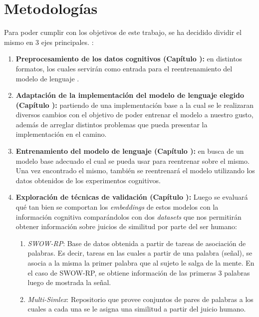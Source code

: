 \chapter{Metodologías}

Para poder cumplir con los objetivos de este trabajo, se ha decidido dividir el mismo en 3 ejes principales. :

\begin{enumerate}
    \item \textbf{Preprocesamiento de los datos cognitivos (Capítulo \bb{[Ref]}):} en distintos formatos, los cuales servirán como entrada para el reentrenamiento del modelo de lenguaje .
    \item \textbf{Adaptación de la implementación del modelo de lenguaje elegido (Capítulo \bb{[Ref]}):} partiendo de una implementación base a la cual se le realizaran diversos cambios con el objetivo de poder entrenar el modelo a nuestro gusto, además de arreglar distintos problemas que pueda presentar la implementación en el camino.
    \item \textbf{Entrenamiento del modelo de lenguaje (Capítulo \bb{[Ref]}):} en busca de un modelo base adecuado el cual se pueda usar para reentrenar sobre el mismo. Una vez encontrado el mismo, también se reentrenará el modelo utilizando los datos obtenidos de los experimentos cognitivos. 
    \item \textbf{Exploración de técnicas de validación (Capítulo \bb{[Ref]}):} Luego se evaluará qué tan bien se comportan los \textit{embeddings} de estos modelos con la información cognitiva comparándolos con dos \textit{datasets} que nos permitirán obtener información sobre juicios de similitud por parte del ser humano:
    \begin{enumerate}
        \item \textit{SWOW-RP}: Base de datos obtenida a partir de tareas de asociación de palabras. Es decir, tareas en las cuales a partir de una palabra (señal), se asocia a la misma la primer palabra que al sujeto le salga de la mente. En el caso de SWOW-RP, se obtiene información de las primeras 3 palabras luego de mostrada la señal. \parencite{Cabana2023}
        \item \textit{Multi-Simlex}: Repositorio que provee conjuntos de pares de palabras a los cuales a cada una se le asigna una similitud a partir del juicio humano. \parencite{Vulic2020}
    \end{enumerate}
\end{enumerate}